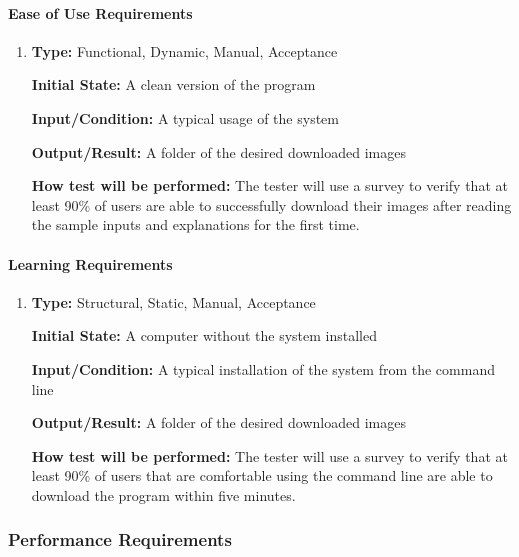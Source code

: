 \documentclass[12pt, titlepage]{article}
\begin{document}
\paragraph{Ease of Use Requirements}

\begin{enumerate}[label=NFR-EUR\arabic*:, wide=0pt, leftmargin=*]

\item \phantom{empty}

\textbf{Type:} Functional, Dynamic, Manual, Acceptance
					
\textbf{Initial State:} A clean version of the program
					
\textbf{Input/Condition:} A typical usage of the system
					
\textbf{Output/Result:} A folder of the desired downloaded images
					
\textbf{How test will be performed:} The tester will use a survey to verify that at least 90\% of users are able to successfully download their images after reading the sample inputs and explanations for the first time.

\end{enumerate}

\paragraph{Learning Requirements}

\begin{enumerate}[label=NFR-LR\textcolor{red}{2}:, wide=0pt, leftmargin=*]

\item \phantom{empty}

\textbf{Type:} Structural, Static, Manual, Acceptance
					
\textbf{Initial State:} A computer without the system installed
					
\textbf{Input/Condition:} A typical installation of the system from the command line
					
\textbf{Output/Result:} A folder of the desired downloaded images
					
\textbf{How test will be performed:} The tester will use a survey to verify that at least 90\% of users that are comfortable using the command line are able to download the program within five minutes.

\end{enumerate}

\subsubsection{Performance Requirements}
\label{PerfReqs}
		
\end{document}
